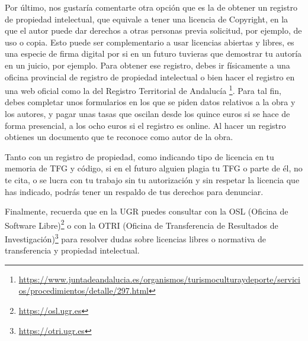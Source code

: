 Por último, nos gustaría comentarte otra opción que es la de obtener un registro de propiedad intelectual, que equivale a tener una licencia de Copyright, en la que el autor puede dar derechos a otras personas previa solicitud, por ejemplo, de uso o copia. Esto puede ser complementario a usar licencias abiertas y libres, es una especie de firma digital por si en un futuro tuvieras que demostrar tu autoría en un juicio, por ejemplo. Para obtener ese registro, debes ir físicamente a una oficina provincial de registro de propiedad intelectual o bien hacer el registro en una web oficial como la del Registro Territorial de Andalucía \footnote{\url{https://www.juntadeandalucia.es/organismos/turismoculturaydeporte/servicios/procedimientos/detalle/297.html}}. Para tal fin, debes completar unos formularios en los que se piden datos relativos a la obra y los autores, y pagar unas tasas que oscilan desde los quince euros si se hace de forma presencial, a los ocho euros si el registro es online. Al hacer un registro obtienes un documento que te reconoce como autor de la obra. %

Tanto con un registro de propiedad, como indicando tipo de licencia en tu memoria de TFG y código, si en el futuro alguien plagia tu TFG o parte de él, no te cita, o se lucra con tu trabajo sin tu autorización y sin respetar la licencia que has indicado, podrás tener un respaldo de tus derechos para denunciar.

Finalmente, recuerda que en la UGR puedes consultar con la OSL (Oficina de Software Libre)\footnote{\url{https://osl.ugr.es}} o con la OTRI (Oficina de Transferencia de Resultados de Investigación)\footnote{\url{https://otri.ugr.es}} para resolver dudas sobre licencias libres o normativa de transferencia y propiedad intelectual.
